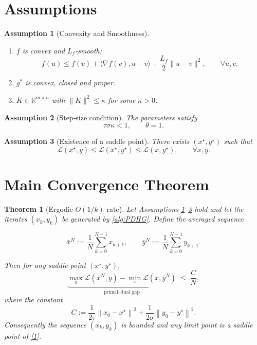 \documentclass{article}
\newtheorem{theorem}{Theorem}
\newtheorem{assumption}{Assumption}
\newcommand{\ip}[2]{\langle #1,#2\rangle}
\newcommand{\norm}[1]{\left\|#1\right\|}
\begin{document}
\section*{Assumptions}
\begin{assumption}[Convexity and Smoothness]\label{ass:convex}
\begin{enumerate}
\item $f$ is convex and $L_{f}$‑smooth:
\[
f(u)\le f(v)+\ip{\nabla f(v)}{u-v}+\frac{L_{f}}{2}\|u-v\|^{2},\qquad\forall u,v.
\tag{4}
\]
\item $g^{*}$ is convex, closed and proper.
\item $K\in\mathbb R^{m\times n}$ with $\|K\|^{2}\le \kappa$ for some $\kappa>0$.
\end{enumerate}
\end{assumption}
\begin{assumption}[Step‑size condition]\label{ass:stepsize}
The parameters satisfy
\[
\tau\sigma\kappa <1,\qquad \theta=1.
\tag{5}
\]
\end{assumption}
\begin{assumption}[Existence of a saddle point]\label{ass:saddle}
There exists $(x^{\star},y^{\star})$ such that
\[
\mathcal L(x^{\star},y)\le\mathcal L(x^{\star},y^{\star})\le\mathcal L(x,y^{\star}),\qquad\forall x,y.
\tag{6}
\]
\end{assumption}

\section*{Main Convergence Theorem}
\begin{theorem}[Ergodic $O(1/k)$ rate]\label{thm:rate}
Let Assumptions \ref{ass:convex}–\ref{ass:saddle} hold and let the iterates $(x_{k},y_{k})$ be generated by \eqref{alg:PDHG}. Define the averaged sequence  

\[
\bar x^{N}:=\frac{1}{N}\sum_{k=0}^{N-1}x_{k+1},\qquad 
\bar y^{N}:=\frac{1}{N}\sum_{k=0}^{N-1}y_{k+1}.
\]

Then for any saddle point $(x^{\star},y^{\star})$,
\[
\underbrace{\max_{y}\mathcal L(\bar x^{N},y)-\min_{x}\mathcal L(x,\bar y^{N})}_{\text{primal–dual gap}}
\;\le\;
\frac{C}{N},
\tag{7}
\]
where the constant  
\[
C:=\frac{1}{2\tau}\norm{x_{0}-x^{\star}}^{2}
      +\frac{1}{2\sigma}\norm{y_{0}-y^{\star}}^{2}.
\tag{8}
\]
Consequently the sequence $(x_{k},y_{k})$ is bounded and any limit point is a saddle point of \eqref{1}.
\end{theorem}
\end{document}
